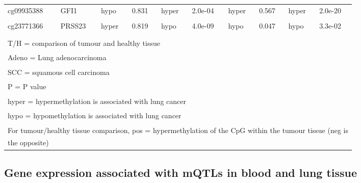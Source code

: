 \documentclass[11pt,oneside]{bristolthesis}
\begin{document}
\begin{table}[!h]
{\begin{tabular}[t]{llllllllll}
cg09935388 & GFI1 & hypo & 0.831 & hyper & 2.0e-04 & hyper & 0.567 & hyper & 2.0e-20\\
\addlinespace
\cellcolor{gray!6}{cg26963277} & \cellcolor{gray!6}{KCNQ1} & \cellcolor{gray!6}{hypo} & \cellcolor{gray!6}{0.299} & \cellcolor{gray!6}{hyper} & \cellcolor{gray!6}{3.6e-02} & \cellcolor{gray!6}{hypo} & \cellcolor{gray!6}{0.314} & \cellcolor{gray!6}{hyper} & \cellcolor{gray!6}{3.0e-03}\\
cg23771366 & PRSS23 & hyper & 0.819 & hypo & 4.0e-09 & hypo & 0.047 & hypo & 3.3e-02\\
\cellcolor{gray!6}{cg11660018} & \cellcolor{gray!6}{PRSS23} & \cellcolor{gray!6}{equal} & \cellcolor{gray!6}{0.999} & \cellcolor{gray!6}{hypo} & \cellcolor{gray!6}{3.0e-08} & \cellcolor{gray!6}{hypo} & \cellcolor{gray!6}{0.062} & \cellcolor{gray!6}{hypo} & \cellcolor{gray!6}{1.3e-01}\\
\bottomrule
\multicolumn{10}{l}{\textsuperscript{} T/H = comparison of tumour and healthy tissue}\\
\multicolumn{10}{l}{\textsuperscript{} Adeno = Lung adenocarcinoma}\\
\multicolumn{10}{l}{\textsuperscript{} SCC = squamous cell carcinoma}\\
\multicolumn{10}{l}{\textsuperscript{} P = P value}\\
\multicolumn{10}{l}{\textsuperscript{} hyper = hypermethylation is associated with lung cancer}\\
\multicolumn{10}{l}{\textsuperscript{} hypo = hypomethylation is associated with lung cancer}\\
\multicolumn{10}{l}{\textsuperscript{} For tumour/healthy tissue comparison, pos = hypermethylation of the CpG within the tumour tissue (neg is}\\
\multicolumn{10}{l}{the opposite)}\\
\end{tabular}}
\end{table}
\hypertarget{gene-expression-associated-with-mqtls-in-blood-and-lung-tissue}{%
\subsection{Gene expression associated with mQTLs in blood and lung tissue}\label{gene-expression-associated-with-mqtls-in-blood-and-lung-tissue}}
\end{document}
